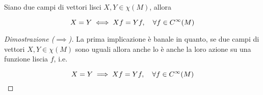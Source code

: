 \begin{theorem}
	Siano due campi di vettori lisci $ X,Y \in \chi(M) $, allora
	
	\begin{equation}
		X = Y \iff X f = Y f \qcomma \forall f \in C^{\infty}(M)
	\end{equation}
\end{theorem}

\begin{proof}[Dimostrazione ($ \implies $)]
	La prima implicazione è banale in quanto, se due campi di vettori $ X,Y \in \chi(M) $ sono uguali allora anche lo è anche la loro azione su una funzione liscia $ f $, i.e.
	
	\begin{equation}
		X = Y \implies X f = Y f \qcomma \forall f \in C^{\infty}(M)
	\end{equation}
\end{proof}

